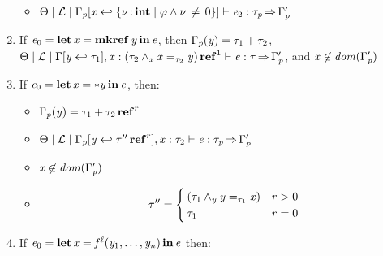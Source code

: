 \begin{lemma}[Inversion]
\begin{enumerate}
\begin{itemize}
    \item $ \Theta   \mid   \mathcal{L}   \mid   \Gamma_{\mathit{p}}  [  \mathit{x}  \hookleftarrow   \left\{{  \nu  \operatorname{:} \mathbf{int} \mid   \varphi  \wedge  \nu \, \neq \, 0  }\right\}   ]   \vdash   \mathit{e_{{\mathrm{2}}}}  :  \tau_{\mathit{p}}   \operatorname{\Rightarrow}   \Gamma'_{\mathit{p}} $
    \end{itemize}
  \item If $\mathit{e_{{\mathrm{0}}}}  =   \operatorname{\mathbf{let}}  \mathit{x}  =   \operatorname{\mathbf{mkref}}  \mathit{y}   \operatorname{\mathbf{in}}  \mathit{e} $, then $\Gamma_{\mathit{p}}  (  \mathit{y}  )  =  \tau_{{\mathrm{1}}}  +  \tau_{{\mathrm{2}}}$, $ \Theta   \mid   \mathcal{L}   \mid   \Gamma  [  \mathit{y}  \hookleftarrow  \tau_{{\mathrm{1}}}  ]  ,  \mathit{x}  :   (   \tau_{{\mathrm{2}}}  \wedge_{ \mathit{x} }   \mathit{x}  =_{ \tau_{{\mathrm{2}}} }  \mathit{y}    )  \operatorname{\mathbf{ref}}^{ 1 }    \vdash   \mathit{e}  :  \tau   \operatorname{\Rightarrow}   \Gamma'_{\mathit{p}} $, and $ \mathit{x}  \not\in   \mathit{dom}( \Gamma'_{\mathit{p}} )  $
  \item If $\mathit{e_{{\mathrm{0}}}}  =   \operatorname{\mathbf{let}}  \mathit{x}  =   *  \mathit{y}   \operatorname{\mathbf{in}}  \mathit{e} $, then:
    \begin{itemize}
    \item $\Gamma_{\mathit{p}}  (  \mathit{y}  )  =   \tau_{{\mathrm{1}}}  +  \tau_{{\mathrm{2}}}  \operatorname{\mathbf{ref}}^{ r } $
    \item $ \Theta   \mid   \mathcal{L}   \mid   \Gamma_{\mathit{p}}  [  \mathit{y}  \hookleftarrow   \tau''  \operatorname{\mathbf{ref}}^{ r }   ]  ,  \mathit{x}  :  \tau_{{\mathrm{2}}}   \vdash   \mathit{e}  :  \tau_{\mathit{p}}   \operatorname{\Rightarrow}   \Gamma'_{\mathit{p}} $
    \item $ \mathit{x}  \not\in \mathit{dom}( \Gamma'_{\mathit{p}} ) $
    \item \[
        \tau'' = \begin{cases}
          (   \tau_{{\mathrm{1}}}  \wedge_{ \mathit{y} }   \mathit{y}  =_{ \tau_{{\mathrm{1}}} }  \mathit{x}    ) &  r   >   0  \\
          \tau_{{\mathrm{1}}} & r  =  0
        \end{cases}
      \]
    \end{itemize}
  \item If $\mathit{e_{{\mathrm{0}}}}  =   \operatorname{\mathbf{let}}  \mathit{x}  =   \mathit{f} ^ \ell (  \mathit{y_{{\mathrm{1}}}} ,\ldots, \mathit{y_{\mathit{n}}}  )   \operatorname{\mathbf{in}}  \mathit{e} $ then:

\end{enumerate}
\end{lemma}
